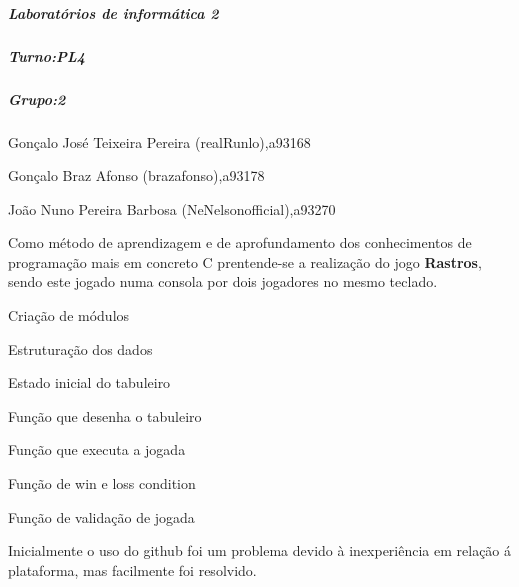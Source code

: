 \label{invalid_invalid}%
%
\subparagraph*{Laboratórios de informática 2}

\label{invalid_invalid}%
%
\subparagraph*{Turno\+:P\+L4}

\label{invalid_invalid}%
%
\subparagraph*{Grupo\+:2}


\begin{DoxyItemize}
\item Gonçalo José Teixeira Pereira (real\+Runlo),a93168
\item Gonçalo Braz Afonso (brazafonso),a93178
\item João Nuno Pereira Barbosa (Ne\+Nelsonofficial),a93270
\end{DoxyItemize}

Como método de aprendizagem e de aprofundamento dos conhecimentos de programação mais em concreto C prentende-\/se a realização do jogo {\bfseries Rastros}, sendo este jogado numa consola por dois jogadores no mesmo teclado.


\begin{DoxyEnumerate}
\item Criação de módulos
\item Estruturação dos dados
\item Estado inicial do tabuleiro
\item Função que desenha o tabuleiro
\item Função que executa a jogada
\item Função de win e loss condition
\item Função de validação de jogada 
\end{DoxyEnumerate}

Inicialmente o uso do github foi um problema devido à inexperiência em relação á plataforma, mas facilmente foi resolvido. 